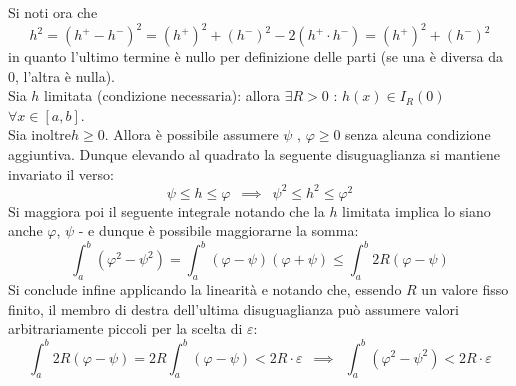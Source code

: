 \documentclass[10pt, oneside]{book}
\theoremstyle{plain}
\begin{document}
Si noti ora che 
\[h^2 = (h^+ - h^-)^2 = (h^+)^2 + (h^-)^2 - 2 (h^+ \cdot h^-) = (h^+)^2 + (h^-)^2\]
in quanto l'ultimo termine è nullo per definizione delle parti (se una è diversa da $0$, l'altra è nulla).
\\Sia $h$ limitata (condizione necessaria): allora $\exists R > 0$ : $h(x) \in I_R(0)$ $\forall x \in [a,b]$.
\\Sia inoltre$h \geq 0$. Allora è possibile assumere $\psi$ , $\varphi \geq 0$ senza alcuna condizione aggiuntiva. Dunque elevando al quadrato la seguente disuguaglianza si mantiene invariato il verso:
\[\psi \leq h \leq \varphi \enspace \implies \enspace \psi^2 \leq h^2 \leq \varphi^2\]
Si maggiora poi il seguente integrale notando che la $h$ limitata implica lo siano anche $\varphi$, $\psi$ - e dunque è possibile maggiorarne la somma:
\[\int_a^b (\varphi^2 - \psi^2) = \int_a^b(\varphi - \psi) (\varphi + \psi) \leq \int_a^b 2R (\varphi - \psi)\]
Si conclude infine applicando la linearità e notando che, essendo $R$ un valore fisso finito, il membro di destra dell'ultima disuguaglianza può assumere valori arbitrariamente piccoli per la scelta di $\varepsilon$:
\[\int_a^b 2R (\varphi - \psi) = 2R \int_a^b (\varphi - \psi) < 2R \cdot \varepsilon \enspace \implies \enspace \int_a^b (\varphi^2 - \psi^2) < 2R \cdot \varepsilon\]
\end{document}
